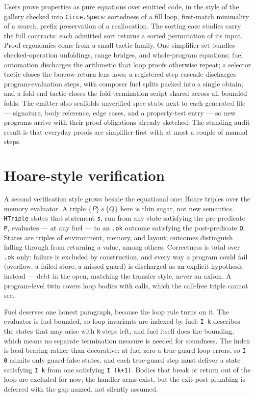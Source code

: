 Users prove properties as pure equations over emitted code, in the style
of the gallery checked into \texttt{Circe.Specs}: sortedness of a fill
loop, first-match minimality of a search, prefix preservation of a
reallocation. The sorting case studies carry the full contracts: each
admitted sort returns a sorted permutation of its input. Proof
ergonomics come from a small tactic family. One
simplifier set bundles checked-operation unfoldings, range bridges, and
whole-program equations; fuel automation discharges the arithmetic that
loop proofs otherwise repeat; a selector tactic closes the borrow-return
lens laws; a registered step cascade discharges program-evaluation
steps, with composer fuel splits packed into a single obtain; and a
fold-end tactic closes the fold-termination script shared across all
bounded folds. The emitter also scaffolds unverified spec stubs next to each
generated file --- signature, body reference, edge cases, and a
property-test entry --- so new programs arrive with their proof
obligations already sketched. The standing audit result is that everyday
proofs are simplifier-first with at most a couple of manual steps.

\section{Hoare-style verification}

A second verification style grows beside the equational one: Hoare
triples over the memory evaluator. A triple $\{P\}~s~\{Q\}$ here is
thin sugar, not new semantics. \texttt{HTriple} states that statement
\texttt{s}, run from any state satisfying the pre-predicate \texttt{P},
evaluates --- at any fuel --- to an \texttt{.ok} outcome satisfying the
post-predicate \texttt{Q}. States are triples of environment, memory,
and layout; outcomes distinguish falling through from returning a
value, among others. Correctness is total over \texttt{.ok} only:
failure is excluded by construction, and every way a program could fail
(overflow, a failed store, a missed guard) is discharged as an explicit
hypothesis instead --- debt in the open, matching the transfer style,
never an axiom. A program-level twin covers loop bodies with calls,
which the call-free triple cannot see.

Fuel deserves one honest paragraph, because the loop rule turns on it.
The evaluator is fuel-bounded, so loop invariants are indexed by fuel:
\texttt{I k} describes the states that may arise with \texttt{k} steps
left, and fuel itself does the bounding, which means no separate
termination measure is needed for soundness. The index is load-bearing
rather than decorative: at fuel zero a true-guard loop errors, so
\texttt{I 0} admits only guard-false states, and each true-guard step
must deliver a state satisfying \texttt{I k} from one satisfying
\texttt{I (k+1)}. Bodies that break or return out of the loop are
excluded for now; the handler arms exist, but the exit-post plumbing is
deferred with the gap named, not silently assumed.

